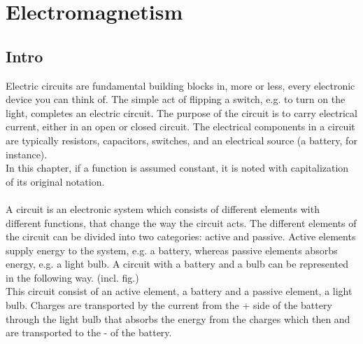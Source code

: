 \chapter{Electromagnetism}
\section{Intro}
Electric circuits are fundamental building blocks in, more or less, every electronic device you can think of. The simple act of flipping a switch, e.g. to turn on the light, completes an electric circuit. The purpose of the circuit is to carry electrical current, either in an open or closed circuit. The electrical components in a circuit are typically resistors, capacitors,  switches, and an electrical source (a battery, for instance).
\\ 
In this chapter, if a function is assumed constant, it is noted with capitalization of its original notation. 
\\ 
\\
A circuit is an electronic system which consists of different elements with different functions, that change the way the circuit acts. The different elements of the circuit can be divided into two categories: active and passive. Active elements supply energy to the system, e.g. a battery, whereas passive elements absorbs energy, e.g. a light bulb. A circuit with a battery and a bulb can be represented in the following way. (incl. fig.)\\ This circuit consist of an active element, a battery and a passive element, a light bulb. Charges are transported by the current from the + side of the battery through the light bulb that absorbs the energy from the charges which then and are transported to the - of the battery.
\\
